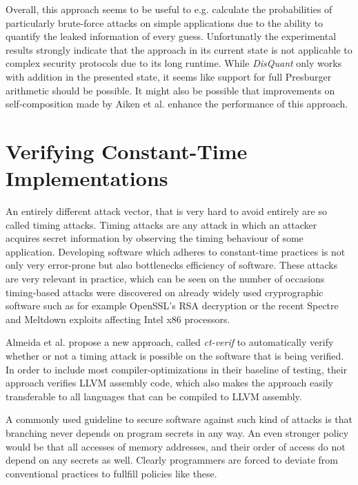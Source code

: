 \documentclass[a4paper,UKenglish]{lipics-v2018}
\begin{document}
Overall, this approach seems to be useful to e.g. calculate the probabilities of particularly brute-force attacks on simple applications due to the ability to quantify the leaked information of every guess. Unfortunatly the experimental results strongly indicate that the approach in its current state is not applicable to complex security protocols due to its long runtime. While \textit{DisQuant} only works with addition in the presented state, it seems like support for full Presburger arithmetic should be possible. It might also be possible that improvements on self-composition made by Aiken et al. enhance the performance of this approach.\cite{secure_information_flow_safety}




\section{Verifying Constant-Time Implementations}
\label{timing}

An entirely different attack vector, that is very hard to avoid entirely are so called timing attacks. Timing attacks are any attack in which an attacker acquires secret information by observing the timing behaviour of some application. Developing software which adheres to constant-time practices is not only very error-prone but also bottlenecks efficiency of software. These attacks are very relevant in practice, which can be seen on the number of occasions timing-based attacks were discovered on already widely used cryprographic software such as for example OpenSSL's RSA decryption\cite{verifying_constant_time_implementations} or the recent Spectre and Meltdown exploits affecting Intel x86 processors.\cite{spectre,meltdown} 

Almeida et al. propose a new approach, called \textit{ct-verif} to automatically verify whether or not a timing attack is possible on the software that is being verified. In order to include most compiler-optimizations in their baseline of testing, their approach verifies LLVM assembly code, which also makes the approach easily transferable to all languages that can be compiled to LLVM assembly.\cite{verifying_constant_time_implementations}

A commonly used guideline to secure software against such kind of attacks is that branching never depends on program secrets in any way. An even stronger policy would be that all accesses of memory addresses, and their order of access do not depend on any secrets as well. Clearly programmers are forced to deviate from conventional practices to fullfill policies like these.\cite{verifying_constant_time_implementations}
\end{document}
